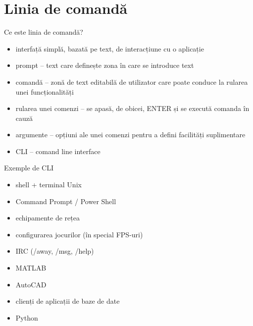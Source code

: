 \documentclass{beamer}
\begin{document}
\section{Linia de comandă}

\begin{frame}{Ce este linia de comandă?}
	\begin{itemize}		%
		\item interfață simplă, bazată pe text, de interacțiune cu o aplicație
		\item prompt -- text care definește zona în care se introduce text
		\item comandă -- zonă de text editabilă de utilizator care poate
		conduce la rularea unei funcționalități
		\item rularea unei comenzi -- se apasă, de obicei, ENTER și se execută
		comanda în cauză
		\item argumente -- opțiuni ale unei comenzi pentru a defini facilități
		suplimentare
		\item CLI -- comand line interface
	\end{itemize}
\end{frame}

\begin{frame}{Exemple de CLI}
	\begin{itemize}
		\item shell + terminal Unix
		\item Command Prompt / Power Shell
		\item echipamente de rețea
		\item configurarea jocurilor (în special FPS-uri)
		\item IRC (/away, /msg, /help)
		\item MATLAB
		\item AutoCAD
		\item clienți de aplicații de baze de date
		\item Python
	\end{itemize}
\end{frame}
\end{document}
